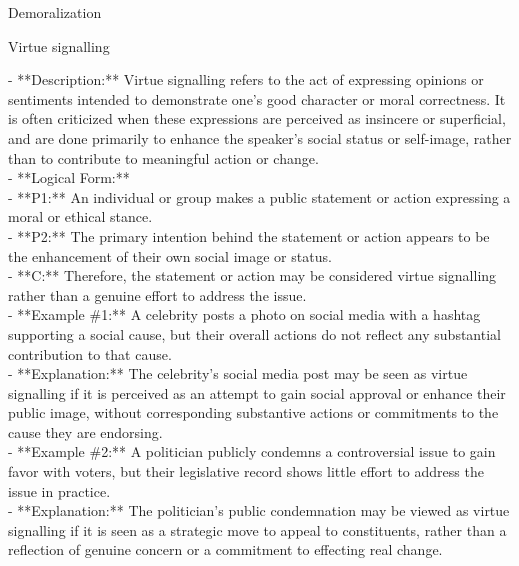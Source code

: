 \documentclass[a4paper,12pt,single,pdftex]{scrartcl}
\begin{document}
Demoralization

Virtue signalling
    
      - **Description:** Virtue signalling refers to the act of expressing opinions or sentiments intended to demonstrate one's good character or moral correctness. It is often criticized when these expressions are perceived as insincere or superficial, and are done primarily to enhance the speaker's social status or self-image, rather than to contribute to meaningful action or change.
    \\

    
      - **Logical Form:**
    \\

    
        - **P1:** An individual or group makes a public statement or action expressing a moral or ethical stance.
    \\

    
        - **P2:** The primary intention behind the statement or action appears to be the enhancement of their own social image or status.
    \\

    
        - **C:** Therefore, the statement or action may be considered virtue signalling rather than a genuine effort to address the issue.
    \\

    
      - **Example \#1:** A celebrity posts a photo on social media with a hashtag supporting a social cause, but their overall actions do not reflect any substantial contribution to that cause.
    \\

    
      - **Explanation:** The celebrity's social media post may be seen as virtue signalling if it is perceived as an attempt to gain social approval or enhance their public image, without corresponding substantive actions or commitments to the cause they are endorsing.
    \\

    
      - **Example \#2:** A politician publicly condemns a controversial issue to gain favor with voters, but their legislative record shows little effort to address the issue in practice.
    \\

    
      - **Explanation:** The politician’s public condemnation may be viewed as virtue signalling if it is seen as a strategic move to appeal to constituents, rather than a reflection of genuine concern or a commitment to effecting real change.
    \\
\end{document}
